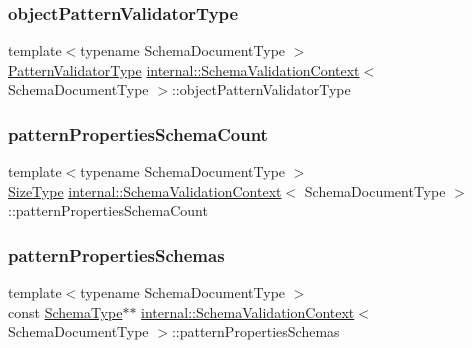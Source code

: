 \subsubsection{\texorpdfstring{object\+Pattern\+Validator\+Type}{objectPatternValidatorType}}
{\footnotesize\ttfamily template$<$typename Schema\+Document\+Type $>$ \\
\hyperlink{structinternal_1_1SchemaValidationContext_a4fb1b8fe7ecb9d4608e6b0ac0716826c}{Pattern\+Validator\+Type} \hyperlink{structinternal_1_1SchemaValidationContext}{internal\+::\+Schema\+Validation\+Context}$<$ Schema\+Document\+Type $>$\+::object\+Pattern\+Validator\+Type}

\mbox{\label{structinternal_1_1SchemaValidationContext_a77d48b63f006479ab8c77f8192558441}} 
\subsubsection{\texorpdfstring{pattern\+Properties\+Schema\+Count}{patternPropertiesSchemaCount}}
{\footnotesize\ttfamily template$<$typename Schema\+Document\+Type $>$ \\
\hyperlink{rapidjson_8h_a5ed6e6e67250fadbd041127e6386dcb5}{Size\+Type} \hyperlink{structinternal_1_1SchemaValidationContext}{internal\+::\+Schema\+Validation\+Context}$<$ Schema\+Document\+Type $>$\+::pattern\+Properties\+Schema\+Count}

\mbox{\label{structinternal_1_1SchemaValidationContext_a12c48f172fbaae2e883f9eb2614d860e}} 
\subsubsection{\texorpdfstring{pattern\+Properties\+Schemas}{patternPropertiesSchemas}}
{\footnotesize\ttfamily template$<$typename Schema\+Document\+Type $>$ \\
const \hyperlink{structinternal_1_1SchemaValidationContext_a79b155ab3711b97b6e33ced450614397}{Schema\+Type}$\ast$$\ast$ \hyperlink{structinternal_1_1SchemaValidationContext}{internal\+::\+Schema\+Validation\+Context}$<$ Schema\+Document\+Type $>$\+::pattern\+Properties\+Schemas}

